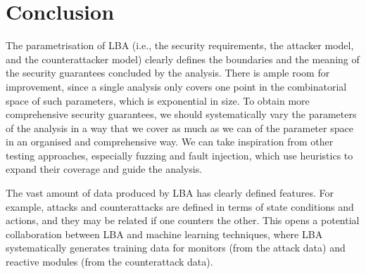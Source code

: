 {\section{Conclusion}
\label{sec:CPSRobustness:Conclusion} 
The parametrisation of LBA (i.e., the security requirements, the attacker model, and the counterattacker model) clearly defines the boundaries and the meaning of the security guarantees concluded by the analysis. There is ample room for improvement, since a single analysis only covers one point in the combinatorial space of such parameters, which is exponential in size. To obtain more comprehensive security guarantees, we should systematically vary the parameters of the analysis in a way that we cover as much as we can of the parameter space in an organised and comprehensive way. We can take inspiration from other testing approaches, especially fuzzing and fault injection, which use heuristics to expand their coverage and guide the analysis. 

The vast amount of data produced by LBA has clearly defined features. For example, attacks and counterattacks are defined in terms of state conditions and actions, and they may be related if one counters the other. This opens a potential collaboration between LBA and machine learning techniques, where LBA systematically generates training data for monitors (from the attack data) and reactive modules (from the counterattack data).











}
